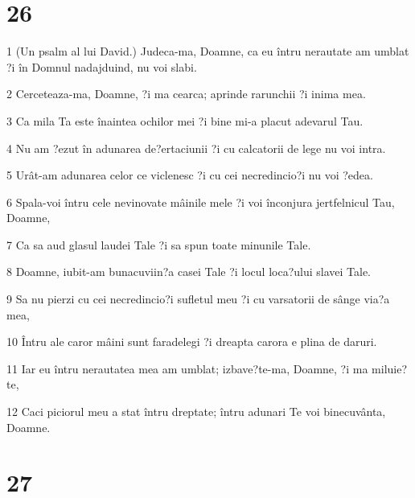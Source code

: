 \chapter{26}

\par 1 (Un psalm al lui David.) Judeca-ma, Doamne, ca eu întru nerautate am umblat ?i în Domnul nadajduind, nu voi slabi.
\par 2 Cerceteaza-ma, Doamne, ?i ma cearca; aprinde rarunchii ?i inima mea.
\par 3 Ca mila Ta este înaintea ochilor mei ?i bine mi-a placut adevarul Tau.
\par 4 Nu am ?ezut în adunarea de?ertaciunii ?i cu calcatorii de lege nu voi intra.
\par 5 Urât-am adunarea celor ce viclenesc ?i cu cei necredincio?i nu voi ?edea.
\par 6 Spala-voi întru cele nevinovate mâinile mele ?i voi înconjura jertfelnicul Tau, Doamne,
\par 7 Ca sa aud glasul laudei Tale ?i sa spun toate minunile Tale.
\par 8 Doamne, iubit-am bunacuviin?a casei Tale ?i locul loca?ului slavei Tale.
\par 9 Sa nu pierzi cu cei necredincio?i sufletul meu ?i cu varsatorii de sânge via?a mea,
\par 10 Întru ale caror mâini sunt faradelegi ?i dreapta carora e plina de daruri.
\par 11 Iar eu întru nerautatea mea am umblat; izbave?te-ma, Doamne, ?i ma miluie?te,
\par 12 Caci piciorul meu a stat întru dreptate; întru adunari Te voi binecuvânta, Doamne.

\chapter{27}

